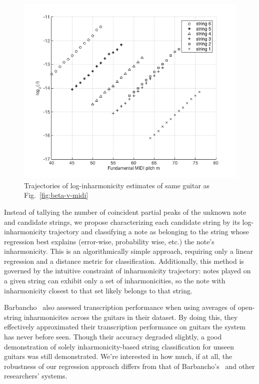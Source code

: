 \documentclass[12pt]{cmuthesis}
\begin{document}
\begin{figure}[h] 
\label{fig:log-beta-v-midi}
\centering
\includegraphics[scale=0.7]{log-beta-v-midi}
\caption{Trajectories of log-inharmonicity estimates of same guitar as Fig.~\ref{fig:beta-v-midi}}
\end{figure}

Instead of tallying the number of coincident partial peaks of the unknown note and candidate strings, we propose characterizing each candidate string by its log-inharmonicity trajectory and classifying a note as belonging to the string whose regression best explains (error-wise, probability wise, etc.) the note's inharmonicity. This is an algorithmically simple approach, requiring only a linear regression and a distance metric for classification. Additionally, this method is governed by the intuitive constraint of inharmonicity trajectory: notes played on a given string can exhibit only a set of inharmonicities, so the note with inharmonicity closest to that set likely belongs to that string. %

Barbancho~\cite{barbanchoi2012} also assessed transcription performance when using averages of open-string inharmonicites across the guitars in their dataset. By doing this, they effectively approximated their transcription performance on guitars the system has never before seen. Though their accuracy degraded slightly, a good demonstration of solely inharmonicity-based string classification for unseen guitars was still demonstrated. We're interested in how much, if at all, the robustness of our regression approach differs from that of Barbancho's~\cite{barbanchoi2012} and other researchers' systems.
\end{document}
